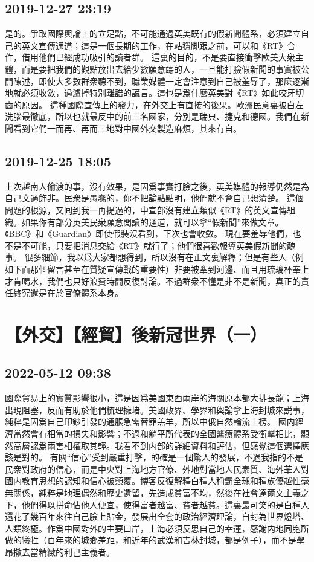 \documentclass[twocolumn]{ctexart}
\begin{document}
\subsection*{2019-12-27 23:19}

是的。爭取國際輿論上的立足點，不可能通過英美既有的假新聞體系，必須建立自己的英文宣傳通道；這是一個長期的工作，在站穩脚跟之前，可以和《RT》合作，借用他們已經成功吸引的讀者群。
這裏的目的，不是要直接衝擊歐美大衆主體，而是要把我們的觀點放出去給少數願意聼的人，一旦能打臉假新聞的事實被公開陳述，即使大多數群衆聽不到，職業媒體一定會注意到自己被羞辱了，那麽逐漸地就必須收斂，過濾掉特別離譜的謊言。這也是爲什麽英美對《RT》如此咬牙切齒的原因。
這種國際宣傳上的發力，在外交上有直接的後果。歐洲民意裏被白左洗腦最徹底，所以也就最反中的前三名國家，分別是瑞典、捷克和德國。我們在新聞看到它們一而再、再而三地對中國外交製造麻煩，其來有自。
\subsection*{2019-12-25 18:05}

上次越南人偷渡的事，沒有效果，是因爲事實打臉之後，英美媒體的報導仍然是為自己文過飾非。民衆是愚蠢的，你不把論點點明，他們就不會自己想清楚。 
這個問題的根源，又囘到我一再提過的，中宣部沒有建立類似《RT》的英文宣傳組織。如果你有部分英美民衆願意閲讀的通道，就可以拿“假新聞”來做文章。《BBC》和《Guardian》即使假裝沒看到，下次也會收斂。 
現在要羞辱他們，也不是不可能，只要把消息交給《RT》就行了；他們很喜歡報導英美假新聞的醜事。 
很多細節，我以爲大家都想得到，所以沒有在正文裏解釋；但是有些人（例如下面那個留言甚至在質疑宣傳戰的重要性）非要被牽到河邊、而且用琉璃杯奉上才肯喝水，我們也只好浪費時間反復討論。不過群衆不懂是非不是新聞，真正的責任終究還是在於官僚體系本身。
\section*{【外交】【經貿】後新冠世界（一）}
\subsection*{2022-05-12 09:38}

國際貿易上的實質影響很小，這是因爲美國東西兩岸的海關原本都大排長龍；上海出現阻塞，反而有助於他們梳理擁堵。美國政界、學界和輿論拿上海封城來説事，純粹是因爲自己印鈔引發的通脹急需替罪羔羊，所以中俄自然輪流上榜。
國内經濟當然會有相當的損失和影響；不過和躺平所代表的全國醫療體系受衝擊相比，顯然高層認爲兩害相權取其輕。我看不到内部的詳細資料和評估，但感覺這個選擇應該是對的。
有關“信心”受到嚴重打擊，的確是一個驚人的發展，不過我指的不是民衆對政府的信心，而是中央對上海地方官僚、外地對當地人民素質、海外華人對國内教育思想的認知和信心被顛覆。博客反復解釋白種人稱霸全球和種族優越性毫無關係，純粹是地理偶然和歷史遺留，先造成貧富不均，然後在社會達爾文主義之下，他們得以拼命佔他人便宜，使得富者越富、貧者越貧。這裏最可笑的是白種人還花了幾百年來往自己臉上貼金，發展出全套的政治經濟理論，自封為世界燈塔、人類終極。作爲中國對外的主要口岸，上海必須反思自己的幸運，感謝内地同胞所做的犧牲（百年來的城鄉差距，和近年的武漢和吉林封城，都是例子），而不是學昂撒去當精緻的利己主義者。
\end{document}
